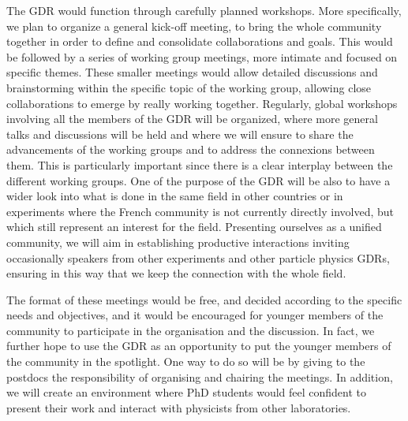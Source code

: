 The GDR would function through carefully planned workshops. More specifically, we plan to organize a general kick-off meeting, to bring the whole community together in order to define and consolidate collaborations and goals.  
This would be followed by a series of working group meetings, more intimate and focused on specific themes. These smaller meetings would allow detailed discussions and brainstorming within the specific topic of the working group, allowing close collaborations to emerge by really working together. Regularly, global workshops involving all the members of the GDR will be organized, where more general talks and discussions will be held and where we will ensure to share the advancements of the working groups and to address the connexions between them. This is particularly important since there is a clear interplay  between the different working groups. One of the purpose of the GDR will be also to have a wider look into what is done in the same field in other countries or in experiments where the French community is not currently directly involved, but which still represent an interest for the field. Presenting ourselves as a unified community, we will aim in establishing productive interactions inviting occasionally speakers from other experiments and other particle physics GDRs, ensuring in this way that we keep the connection with the whole field.

The format of these meetings would be free, and decided according to the specific needs and objectives, and it would be encouraged for younger members of the community to participate in the organisation and the discussion.
In fact, we further hope to use the GDR as an opportunity to put the younger members of the community in the spotlight. One way to do so will be  by giving to the postdocs the responsibility of organising and chairing the meetings. In addition, we will create an environment where PhD students would feel confident to present their work and interact with physicists from other laboratories.










